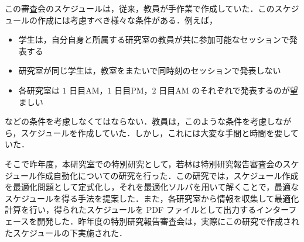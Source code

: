 \documentclass[a4paper,12pt,fleqn]{jarticle}
\begin{document}
この審査会のスケジュールは，従来，教員が手作業で作成していた．このスケジュールの作成には考慮すべき様々な条件がある．例えば，
\begin{itemize}
\item 学生は，自分自身と所属する研究室の教員が共に参加可能なセッションで発表する
\item 研究室が同じ学生は，教室をまたいで同時刻のセッションで発表しない
\item 各研究室は $1$ 日目AM，$1$ 日目PM，$2$ 日目AM のそれぞれで発表するのが望ましい
\end{itemize}
などの条件を考慮しなくてはならない．教員は，このような条件を考慮しながら，スケジュールを作成していた．しかし，これには大変な手間と時間を要していた．

そこで昨年度，本研究室での特別研究として，若林\cite{wakabayasi}は特別研究報告審査会のスケジュール作成自動化についての研究を行った．この研究では，スケジュール作成を最適化問題として定式化し，それを最適化ソルバを用いて解くことで，最適なスケジュールを得る手法を提案した．また，各研究室から情報を収集して最適化計算を行い，得られたスケジュールを PDF ファイルとして出力するインターフェースを開発した．昨年度の特別研究報告審査会は，実際にこの研究で作成されたスケジュールの下実施された．
\end{document}
